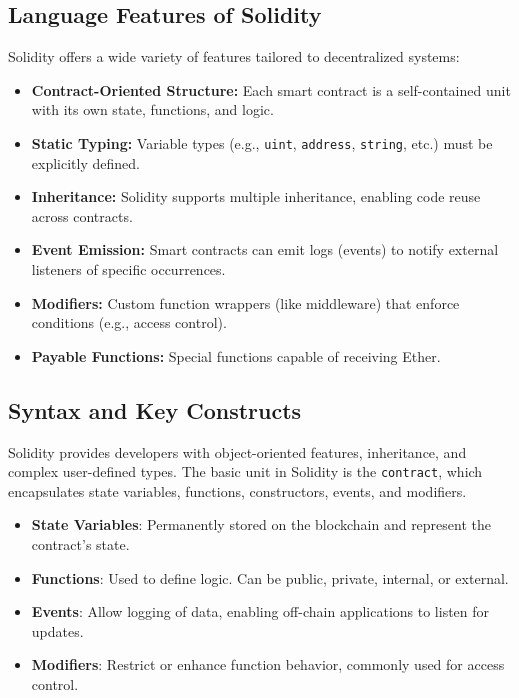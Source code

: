 \subsection*{Language Features of Solidity}
Solidity offers a wide variety of features tailored to decentralized systems:

\begin{itemize}
  \item \textbf{Contract-Oriented Structure:} Each smart contract is a self-contained unit with its own state, functions, and logic.
  \item \textbf{Static Typing:} Variable types (e.g., \texttt{uint}, \texttt{address}, \texttt{string}, etc.) must be explicitly defined.
  \item \textbf{Inheritance:} Solidity supports multiple inheritance, enabling code reuse across contracts.
  \item \textbf{Event Emission:} Smart contracts can emit logs (events) to notify external listeners of specific occurrences.
  \item \textbf{Modifiers:} Custom function wrappers (like middleware) that enforce conditions (e.g., access control).
  \item \textbf{Payable Functions:} Special functions capable of receiving Ether.
\end{itemize}


\subsection*{Syntax and Key Constructs}
Solidity provides developers with object-oriented features, inheritance, and complex user-defined types. The basic unit in Solidity is the \texttt{contract}, which encapsulates state variables, functions, constructors, events, and modifiers.

\begin{itemize}
  \item \textbf{State Variables}: Permanently stored on the blockchain and represent the contract's state.
  \item \textbf{Functions}: Used to define logic. Can be public, private, internal, or external.
  \item \textbf{Events}: Allow logging of data, enabling off-chain applications to listen for updates.
  \item \textbf{Modifiers}: Restrict or enhance function behavior, commonly used for access control.
\end{itemize}

